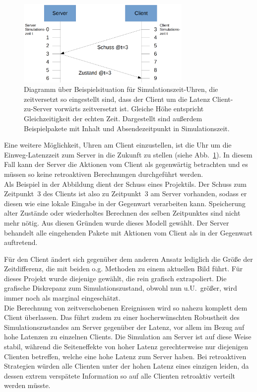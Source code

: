 \begin{figure}
    \centering
    \includegraphics[width=0.75\textwidth]{./Zeichnung2a.png}
    \caption{Diagramm über Beispielsituation für Simulationszeit-Uhren, die zeitversetzt so eingestellt sind, dass der Client um die Latenz Client-zu-Server vorwärts zeitversetzt ist. Gleiche Höhe entspricht Gleichzeitigkeit der echten Zeit. Dargestellt sind außerdem Beispielpakete mit Inhalt und Absendezeitpunkt in Simulationszeit.}
    \label{fig:zeichnung2a}
\end{figure}
Eine weitere Möglichkeit, Uhren am Client einzustellen, ist die Uhr um die Einweg-Latenzzeit zum Server in die Zukunft zu stellen (siehe Abb.~\ref{fig:zeichnung2a}). In diesem Fall kann der Server die Aktionen vom Client als gegenwärtig betrachten und es müssen so keine retroaktiven Berechnungen durchgeführt werden.\\
Als Beispiel in der Abbildung dient der Schuss eines Projektils.
Der Schuss zum Zeitpunkt~3 des Clients ist also zu Zeitpunkt~3 am Server vorhanden, sodass er diesen wie eine lokale Eingabe in der Gegenwart verarbeiten kann. Speicherung alter Zustände oder wiederholtes Berechnen des selben Zeitpunktes sind nicht mehr nötig.
Aus diesen Gründen wurde dieses Modell gewählt. Der Server behandelt alle eingehenden Pakete mit Aktionen vom Client als in der Gegenwart auftretend.

Für den Client ändert sich gegenüber dem anderen Ansatz lediglich die Größe der Zeitdifferenz, die mit beiden o.g. Methoden zu einem aktuellen Bild führt. Für dieses Projekt wurde diejenige gewählt, die rein grafisch extrapoliert. Die grafische Diskrepanz zum Simulationszustand, obwohl nun u.U.~größer, wird immer noch als marginal eingeschätzt.\\

Die Berechnung von zeitverschobenen Ereignissen wird so nahezu komplett dem Client überlassen.
Das führt zudem zu einer hocherwünschten Robustheit des Simulationszustandes am Server gegenüber der Latenz, vor allem im Bezug auf hohe Latenzen zu einzelnen Clients. Die Simulation am Server ist auf diese Weise stabil, während die Seiteneffekte von hoher Latenz gerechterweise nur diejenigen Clienten betreffen, welche eine hohe Latenz zum Server haben.
Bei retroaktiven Strategien würden alle Clienten unter der hohen Latenz eines einzigen leiden, da dessen extrem verspätete Information so auf alle Clienten retroaktiv verteilt werden müsste.

